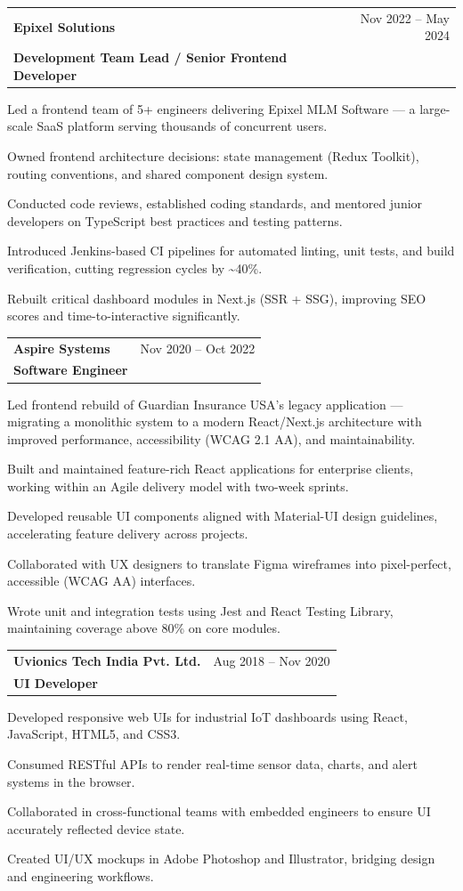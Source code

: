 \documentclass[a4paper,9.8pt]{article}
\makeatletter
\newcommand{\jobentry}[3]{%
  \begin{tabularx}{\linewidth}{@{}X r@{}}
    {\bfseries\color{maroon}#1} & {\small\color{darkgray}#3}\\
    {\small\bfseries #2} & \\
  \end{tabularx}%
  \vspace{2pt}%
}
\makeatother
\begin{document}
\jobentry{Epixel Solutions}{Development Team Lead / Senior Frontend Developer}{Nov 2022 – May 2024}
\begin{cvitems}
  \item Led a frontend team of 5+ engineers delivering Epixel MLM Software — a large-scale SaaS platform serving thousands of concurrent users.
  \item Owned frontend architecture decisions: state management (Redux Toolkit), routing conventions, and shared component design system.
  \item Conducted code reviews, established coding standards, and mentored junior developers on TypeScript best practices and testing patterns.
  \item Introduced Jenkins-based CI pipelines for automated linting, unit tests, and build verification, cutting regression cycles by \textasciitilde40\%.
  \item Rebuilt critical dashboard modules in Next.js (SSR + SSG), improving SEO scores and time-to-interactive significantly.
\end{cvitems}
\vspace{4pt}

\jobentry{Aspire Systems}{Software Engineer}{Nov 2020 – Oct 2022}
\begin{cvitems}
  \item Led frontend rebuild of Guardian Insurance USA's legacy application — migrating a monolithic system to a modern React/Next.js architecture with improved performance, accessibility (WCAG 2.1 AA), and maintainability.
  \item Built and maintained feature-rich React applications for enterprise clients, working within an Agile delivery model with two-week sprints.
  \item Developed reusable UI components aligned with Material-UI design guidelines, accelerating feature delivery across projects.
  \item Collaborated with UX designers to translate Figma wireframes into pixel-perfect, accessible (WCAG AA) interfaces.
  \item Wrote unit and integration tests using Jest and React Testing Library, maintaining coverage above 80\% on core modules.
\end{cvitems}
\vspace{4pt}

\jobentry{Uvionics Tech India Pvt. Ltd.}{UI Developer}{Aug 2018 – Nov 2020}
\begin{cvitems}
  \item Developed responsive web UIs for industrial IoT dashboards using React, JavaScript, HTML5, and CSS3.
  \item Consumed RESTful APIs to render real-time sensor data, charts, and alert systems in the browser.
  \item Collaborated in cross-functional teams with embedded engineers to ensure UI accurately reflected device state.
  \item Created UI/UX mockups in Adobe Photoshop and Illustrator, bridging design and engineering workflows.
\end{cvitems}
\end{document}
